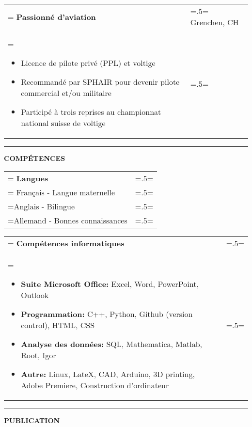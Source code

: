 \documentclass[letterpaper, 11pt]{article}
\begin{document}
\begin{tabularx}{1.0\textwidth} { 
   >{\raggedright\arraybackslash\hsize=1.5\hsize\linewidth=\hsize}X 
   >{\raggedleft\arraybackslash\hsize=.5\hsize\linewidth=\hsize}X }
\normalsize
\bf{
Passionné d'aviation} & Grenchen, CH\\
\normalfont \begin{itemize}[leftmargin=*,noitemsep,topsep=0pt]
\item Licence de pilote privé (PPL) et voltige
\item Recommandé par SPHAIR pour devenir pilote commercial et/ou militaire
\item Participé à trois reprises au championnat national suisse de voltige
\end{itemize} & 2014
\end{tabularx}


\begin{center}
\noindent\rule{0.75\textwidth}{1pt}
\end{center}

\begin{center}
\large\bf{COMPÉTENCES}
\end{center}

\begin{tabularx}{1.0\textwidth} { 
   >{\raggedright\arraybackslash\hsize=1.5\hsize\linewidth=\hsize}X 
   >{\raggedleft\arraybackslash\hsize=.5\hsize\linewidth=\hsize}X }
\normalsize
\bf{Langues} & \\
\normalfont
Français - Langue maternelle & \\
Anglais - Bilingue & \\
Allemand - Bonnes connaissances 
\end{tabularx}
\vspace{0.25cm}

\begin{tabularx}{1.0\textwidth} { 
   >{\raggedright\arraybackslash\hsize=1.5\hsize\linewidth=\hsize}X 
   >{\raggedleft\arraybackslash\hsize=.5\hsize\linewidth=\hsize}X }
\normalsize
\bf{Compétences informatiques} & \\
\normalfont \begin{itemize}[leftmargin=*,noitemsep,topsep=0pt]
\item \textbf{Suite Microsoft Office:}  Excel, Word, PowerPoint, Outlook
\item \textbf{Programmation:} C++, Python, Github (version control), HTML, CSS
\item \textbf{Analyse des données:} SQL, Mathematica, Matlab, Root, Igor
\item \textbf{Autre:} Linux, LateX, CAD, Arduino, 3D printing, Adobe Premiere, Construction d'ordinateur
\end{itemize} & 
\end{tabularx}

\begin{center}
\noindent\rule{0.75\textwidth}{1pt}
\end{center}

\begin{center}
\large\bf{PUBLICATION}
\end{center}

\nocite{*}

\printbibliography[title=\normalsize Thèse de maîtrise universitaire]

\end{document}
